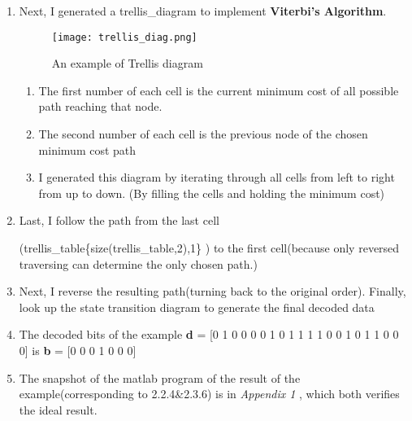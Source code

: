 \documentclass{article}
\begin{document}
\begin{CJK*}{UTF8}{bsmi}
\begin{enumerate}
    \item Next, I generated a trellis\_diagram to implement \textbf{Viterbi's Algorithm}.
    \begin{figure}[h]
    \centering
    \texttt{[image: trellis\_diag.png]}
    \caption{\label{fig:trellis_diag.png} An example of Trellis diagram}
    \end{figure}
        \begin{enumerate}
            \item The first number of each cell is the current minimum cost of all possible path reaching that node.
            \item The second number of each cell is the previous node of the chosen minimum cost path
            \item I generated this diagram by iterating through all cells from left to right from up to down. (By filling the cells and holding the minimum cost)
        \end{enumerate}
    \item Last, I follow the path from the last cell
    
    (trellis\_table\{size(trellis\_table,2),1\} ) to the first cell(because only reversed traversing can determine the only chosen path.)
    \item Next, I reverse the resulting path(turning back to the original order). Finally, look up the state transition diagram to generate the final decoded data
    \item The decoded bits of the example \textbf{d} = [0 1 0 0 0 0 1 0 1 1 1 1 0 0 1 0 1 1 0 0 0] is \textbf{b} = [0     0     0     1     0     0     0] 
    \item The snapshot of the matlab program of the result of the example(corresponding to 2.2.4\&2.3.6) is in \emph{Appendix 1} , which both verifies the ideal result.
\end{enumerate}


\end{CJK*}
\end{document}
